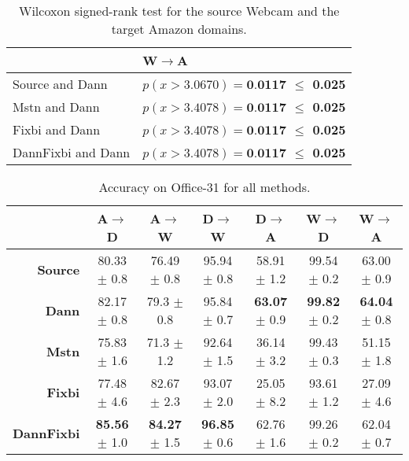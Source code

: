 \begin{table}[H]
\centering
\caption{Wilcoxon signed-rank test for the source Webcam and the target Amazon domains.}
\label{tab:WA_wil}
\begin{tabular}{|l|l|}
\hline
 & W$\rightarrow$A \\ \hline
Source and Dann & \textbf{$p(x > 3.0670) = \textbf{0.0117}$ $\leq$ 0.025} \\ \hline
Mstn and Dann & \textbf{$p(x > 3.4078) = \textbf{0.0117}$ $\leq$ 0.025} \\ \hline
Fixbi and Dann & \textbf{$p(x > 3.4078) = \textbf{0.0117}$ $\leq$ 0.025} \\\hline
DannFixbi and Dann & \textbf{$p(x > 3.4078)= \textbf{0.0117}$ $\leq$ 0.025} \\ \hline
\end{tabular}
\end{table} 

\begin{table}[H]
\caption{Accuracy on Office-31 for all methods.}
\label{tab:all_avg}
\hskip-1.2cm \begin{tabular}{|r|c|c|c|c|c|c|}
\hline
\multicolumn{1}{|c|}{} & \multicolumn{1}{c|}{A$\rightarrow$D} & \multicolumn{1}{c|}{A$\rightarrow$W} & \multicolumn{1}{c|}{D$\rightarrow$W} & \multicolumn{1}{c|}{D$\rightarrow$A} & \multicolumn{1}{c|}{W$\rightarrow$D} & \multicolumn{1}{c|}{W$\rightarrow$A} \\ \hline
\textbf{Source} & 80.33 $\pm$ 0.8 & 76.49 $\pm$ 0.8 & 95.94 $\pm$ 0.8 & 58.91 $\pm$ 1.2 & 99.54 $\pm$ 0.2 & 63.00 $\pm$ 0.9\\ \hline
\textbf{Dann} & 82.17 $\pm$ 0.8 & 79.3 $\pm$ 0.8 & 95.84 $\pm$ 0.7 & \textbf{63.07} $\pm$ 0.9& \textbf{99.82} $\pm$ 0.2 & \textbf{64.04} $\pm$ 0.8\\ \hline
\textbf{Mstn} & 75.83 $\pm$ 1.6 & 71.3 $\pm$ 1.2 & 92.64 $\pm$ 1.5 & 36.14 $\pm$ 3.2 & 99.43 $\pm$ 0.3 & 51.15 $\pm$ 1.8 \\ \hline
\textbf{Fixbi} & 77.48 $\pm$ 4.6& 82.67 $\pm$ 2.3 & 93.07 $\pm$ 2.0 & 25.05 $\pm$ 8.2 & 93.61 $\pm$ 1.2 & 27.09 $\pm$ 4.6 \\ \hline
\textbf{DannFixbi} & \textbf{85.56} $\pm$ 1.0 & \textbf{84.27} $\pm$ 1.5 & \textbf{96.85} $\pm$ 0.6 & 62.76 $\pm$ 1.6 & 99.26 $\pm$ 0.2 & 62.04 $\pm$ 0.7 \\ \hline
\end{tabular}
\end{table}

